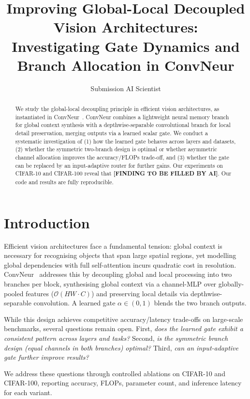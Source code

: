 \documentclass{article} %
\title{Improving Global-Local Decoupled Vision Architectures: \\
       Investigating Gate Dynamics and Branch Allocation in ConvNeur}
\author{Submission AI Scientist}
\begin{document}
\maketitle

\begin{abstract}
We study the global-local decoupling principle in efficient vision architectures, as instantiated in ConvNeur~\citep{yang2026convneur}. ConvNeur combines a lightweight neural memory branch for global context synthesis with a depthwise-separable convolutional branch for local detail preservation, merging outputs via a learned scalar gate. We conduct a systematic investigation of (1) how the learned gate behaves across layers and datasets, (2) whether the symmetric two-branch design is optimal or whether asymmetric channel allocation improves the accuracy/FLOPs trade-off, and (3) whether the gate can be replaced by an input-adaptive router for further gains. Our experiments on CIFAR-10 and CIFAR-100 reveal that \textbf{[FINDING TO BE FILLED BY AI]}. Our code and results are fully reproducible.
\end{abstract}

\section{Introduction}
\label{sec:intro}
Efficient vision architectures face a fundamental tension: global context is necessary for recognising objects that span large spatial regions, yet modelling global dependencies with full self-attention incurs quadratic cost in resolution. ConvNeur~\citep{yang2026convneur} addresses this by decoupling global and local processing into two branches per block, synthesising global context via a channel-MLP over globally-pooled features ($\mathcal{O}(HW \cdot C)$) and preserving local details via depthwise-separable convolution. A learned gate $\alpha \in (0, 1)$ blends the two branch outputs.

While this design achieves competitive accuracy/latency trade-offs on large-scale benchmarks, several questions remain open. First, \textit{does the learned gate exhibit a consistent pattern across layers and tasks?} Second, \textit{is the symmetric branch design (equal channels in both branches) optimal?} Third, \textit{can an input-adaptive gate further improve results?}

We address these questions through controlled ablations on CIFAR-10 and CIFAR-100, reporting accuracy, FLOPs, parameter count, and inference latency for each variant.
\end{document}
